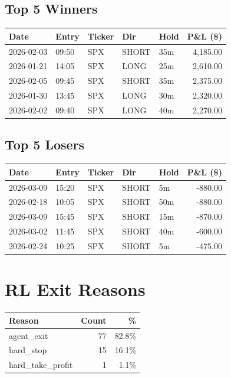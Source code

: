 \documentclass[11pt,a4paper,twoside]{article}
\begin{document}
\subsection*{Top 5 Winners}
\noindent\begin{center}
\begin{tabular}{>{\color{txtmain}}l llll r}
\toprule
\rowcolor{cardbg}
\textbf{Date} & \textbf{Entry} & \textbf{Ticker} & \textbf{Dir} & \textbf{Hold} & \textbf{P\&L (\$)} \\
\midrule
2026-02-03 & 09:50 & SPX & SHORT & 35m & \textcolor{wingreen}{4,185.00} \\
2026-01-21 & 14:05 & SPX & LONG & 25m & \textcolor{wingreen}{2,610.00} \\
2026-02-05 & 09:45 & SPX & SHORT & 35m & \textcolor{wingreen}{2,375.00} \\
2026-01-30 & 13:45 & SPX & LONG & 30m & \textcolor{wingreen}{2,320.00} \\
2026-02-02 & 09:40 & SPX & LONG & 40m & \textcolor{wingreen}{2,270.00} \\
\bottomrule
\end{tabular}
\end{center}
\subsection*{Top 5 Losers}
\noindent\begin{center}
\begin{tabular}{>{\color{txtmain}}l llll r}
\toprule
\rowcolor{cardbg}
\textbf{Date} & \textbf{Entry} & \textbf{Ticker} & \textbf{Dir} & \textbf{Hold} & \textbf{P\&L (\$)} \\
\midrule
2026-03-09 & 15:20 & SPX & SHORT & 5m & \textcolor{lossred}{-880.00} \\
2026-02-18 & 10:05 & SPX & SHORT & 50m & \textcolor{lossred}{-880.00} \\
2026-03-09 & 15:45 & SPX & SHORT & 15m & \textcolor{lossred}{-870.00} \\
2026-03-02 & 11:45 & SPX & SHORT & 40m & \textcolor{lossred}{-600.00} \\
2026-02-24 & 10:25 & SPX & SHORT & 5m & \textcolor{lossred}{-475.00} \\
\bottomrule
\end{tabular}
\end{center}
\clearpage
\section*{RL Exit Reasons}
\noindent\begin{center}
\begin{tabular}{>{\color{txtmain}}l rr}
\toprule
\rowcolor{cardbg}
\textbf{Reason} & \textbf{Count} & \textbf{\%} \\
\midrule
agent\_exit & 77 & 82.8\% \\
hard\_stop & 15 & 16.1\% \\
hard\_take\_profit & 1 & 1.1\% \\
\bottomrule
\end{tabular}
\end{center}
\end{document}
